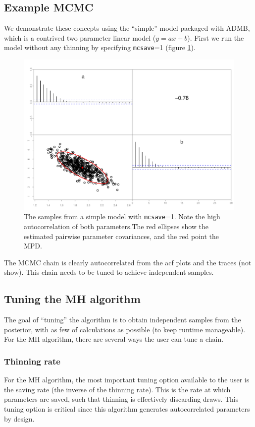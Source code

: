 \documentclass{article}\usepackage[]{graphicx}\usepackage[]{color}
\begin{document}
\subsection{Example MCMC}
We demonstrate these concepts using the ``simple'' model
packaged with ADMB, which is a contrived two parameter
linear model ($y=ax+b$). First we run the model without any
thinning by specifying \texttt{mcsave}=1 (figure
\ref{fig:simple1}).
\begin{figure}[h]
  \centering
  \includegraphics[width=5in]{../plots/simple1.pdf}
  \caption{The samples from a simple model with
    \texttt{mcsave}=1. Note the high autocorrelation of both
    parameters.The red ellipses show the estimated pairwise
    parameter covariances, and the red point the MPD.}
  \label{fig:simple1}
\end{figure}
The MCMC chain is clearly autocorrelated from the acf plots
and the traces (not show). This chain needs to be tuned to
achieve independent samples.
\subsection{Tuning the MH algorithm}\label{sec:MHtuning}
The goal of ``tuning'' the algorithm is to obtain
independent samples from the posterior, with as few of
calculations as possible (to keep runtime manageable). For
the MH algorithm, there are several ways the user can tune a chain.

\subsubsection{Thinning rate}
For the MH algorithm, the most important tuning option
available to the user is the saving rate (the inverse of the
thinning rate). This is the rate at which parameters are
saved, such that thinning is effectively discarding
draws. This tuning option is critical since this algorithm
generates autocorrelated parameters by design.
\end{document}
